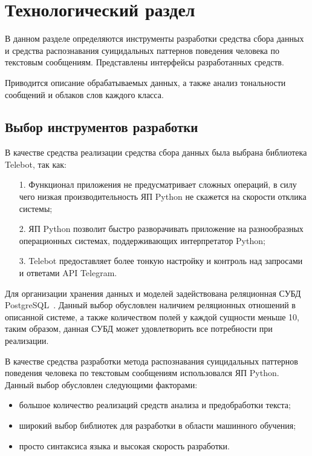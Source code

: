 \section{Технологический раздел}

В данном разделе определяются инструменты разработки средства сбора данных и средства распознавания суицидальных паттернов поведения человека по текстовым сообщениям.
Представлены интерфейсы разработанных средств.

Приводится описание обрабатываемых данных, а также анализ тональности сообщений и облаков слов каждого класса.

\subsection{Выбор инструментов разработки}

В качестве средства реализации средства сбора данных была выбрана библиотека Telebot, так как:

\begin{enumerate}
	\item[1.] Функционал приложения не предусматривает сложных операций, в силу чего низкая производительность ЯП Python не скажется на скорости отклика системы;
	\item[2.] ЯП Python позволит быстро разворачивать приложение на разнообразных операционных системах, поддерживающих интерпретатор Python;
	\item[3.] Telebot предоставляет более тонкую настройку и контроль над запросами и ответами API Telegram.
\end{enumerate}

Для организации хранения данных и моделей задействована реляционная СУБД PostgreSQL~\cite{postgres}. 
Данный выбор обусловлен наличием реляционных отношений в описанной системе, а также количеством полей у каждой сущности меньше 10, таким образом, данная СУБД может удовлетворить все потребности при реализации.

В качестве средства разработки метода распознавания суицидальных паттернов поведения человека по текстовым сообщениям использовался ЯП Python. Данный выбор обусловлен следующими факторами:

\begin{itemize}
	\item большое количество реализаций средств анализа и предобработки текста;
	\item широкий выбор библиотек для разработки в области машинного обучения;
	\item просто синтаксиса языка и высокая скорость разработки.
\end{itemize}

